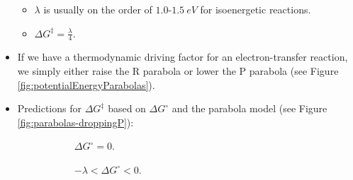 \documentclass[../notes.tex]{subfiles}
\begin{document}
\begin{itemize}
    \begin{itemize}
        \item $\lambda$ is usually on the order of $1.0$-$\SI{1.5}{eV}$ for isoenergetic reactions.
        \item $\Delta G^\ddagger=\frac{\lambda}{4}$.
    \end{itemize}
    \item If we have a thermodynamic driving factor for an electron-transfer reaction, we simply either raise the R parabola or lower the P parabola (see Figure \ref{fig:potentialEnergyParabolas}).
    \item Predictions for $\Delta G^\ddagger$ based on $\Delta G^\circ$ and the parabola model (see Figure \ref{fig:parabolas-droppingP}):
    \begin{figure}[h!]
        \centering
        \begin{subfigure}[b]{0.24\linewidth}
            \centering
            \caption{$\Delta G^\circ=0$.}
            \label{fig:parabolas-droppingPa}
        \end{subfigure}
        \begin{subfigure}[b]{0.24\linewidth}
            \centering
            \caption{$-\lambda<\Delta G^\circ<0$.}
            \label{fig:parabolas-droppingPb}
        \end{subfigure}
        \begin{subfigure}[b]{0.24\linewidth}
            \centering
\end{subfigure}
\end{figure}
\end{itemize}
\end{document}
